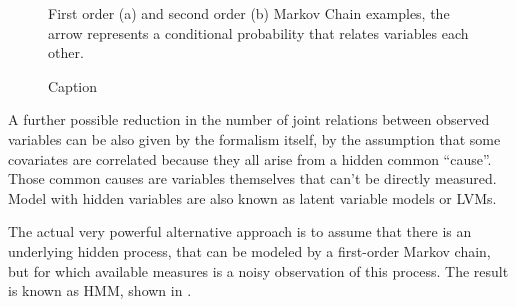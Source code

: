 \begin{figure}
    \centering
    \caption{First order (a) and second order (b) Markov Chain examples, the arrow represents a conditional probability that relates variables each other.}
    \label{fig:simple_markov_chains}
\end{figure}

\begin{figure}
    \centering
    \caption{Caption}
\end{figure}

A further possible reduction in the number of joint relations between observed variables can be also given by the formalism itself,  by the assumption that some covariates are correlated because they all arise from a hidden common “cause”. Those common causes are variables themselves that can't be directly measured.  Model with hidden variables are also known as latent variable models or LVMs. 

The actual very powerful alternative approach is to assume that there is an underlying hidden process, that can be modeled by a first-order Markov chain, but for which available measures is a noisy observation of this process. The result is known as \acl{HMM}, shown in \Figure{\ref{fig:hidden_markov}}. 










